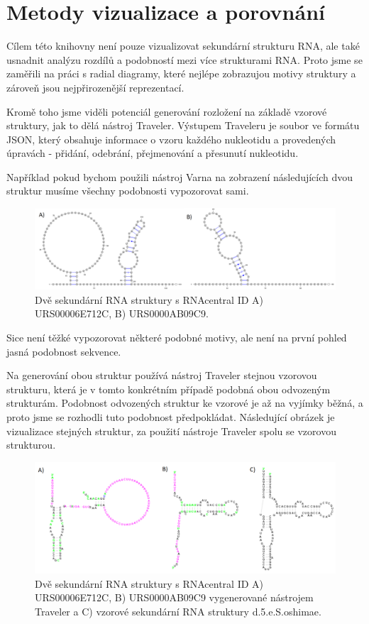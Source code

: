 
\chapter{Metody vizualizace a porovnání}

Cílem této knihovny není pouze vizualizovat sekundární strukturu RNA, ale také
usnadnit analýzu rozdílů a podobností mezi více strukturami RNA. Proto jsme se
zaměřili na práci s radial diagramy, které nejlépe zobrazujou motivy struktury
a zároveň jsou nejpřirozenější reprezentací.

Kromě toho jsme viděli potenciál generování rozložení na základě vzorové
struktury, jak to dělá nástroj Traveler. Výstupem Traveleru je soubor ve
formátu JSON, který obsahuje informace o vzoru každého nukleotidu a provedených
úpravách - přidání, odebrání, přejmenování a přesunutí nukleotidu.

Například pokud bychom použili nástroj Varna na zobrazení následujících dvou
struktur musíme všechny podobnosti vypozorovat sami. 

\begin{figure}[H]
  \centering
  \includegraphics[width=140mm]{../img/kap02/intro/varna.png}
  \caption{Dvě sekundární RNA struktury s RNAcentral ID A) URS00006E712C, B)
  URS0000AB09C9.}
\end{figure}

Sice není těžké vypozorovat některé podobné motivy, ale není na první pohled
jasná podobnost sekvence.

Na generování obou struktur používá nástroj Traveler stejnou vzorovou
strukturu, která je v tomto konkrétním případě podobná obou odvozeným
strukturám. Podobnost odvozených struktur ke vzorové je až na vyjímky běžná, a
proto jsme se rozhodli tuto podobnost předpokládat. Následující obrázek je
vizualizace stejných struktur, za použití nástroje Traveler spolu se vzorovou
strukturou.

\begin{figure}[H]
  \centering
  \includegraphics[width=140mm]{../img/kap02/intro/alignMotivationTemplate.png}
  \caption{Dvě sekundární RNA struktury s RNAcentral ID A) URS00006E712C, B)
  URS0000AB09C9 vygenerované nástrojem Traveler a C) vzorové sekundární RNA
  struktury d.5.e.S.oshimae.}
\end{figure}

